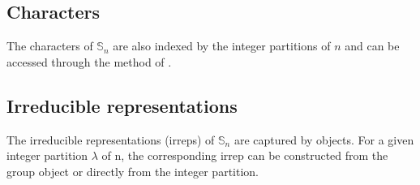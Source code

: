 \documentclass[letterpaper,10pt,english]{sphinxmanual}
\begin{document}
\subsection{Characters}
\label{\detokenize{index:characters}}
\sphinxAtStartPar
The characters of \(\mathbb{S}_n\) are also indexed by the integer partitions of \(n\)
and can be accessed through the  method of .

\begin{sphinxVerbatim}[commandchars=\\\{\}]
\PYG{p}{[}\PYG{p}{]}
\end{sphinxVerbatim}


\subsection{Irreducible representations}
\label{\detokenize{index:irreducible-representations}}
\sphinxAtStartPar
The irreducible representations (irreps) of \(\mathbb{S}_n\) are captured by  objects. For a
given integer partition \(\lambda\) of n, the corresponding irrep can be constructed from
the group object or directly from the integer partition.

\begin{sphinxVerbatim}[commandchars=\\\{\}]
\PYG{p}{[}\PYG{p}{]}

\PYG{p}{[}\PYG{p}{]}
\end{sphinxVerbatim}
\end{document}

